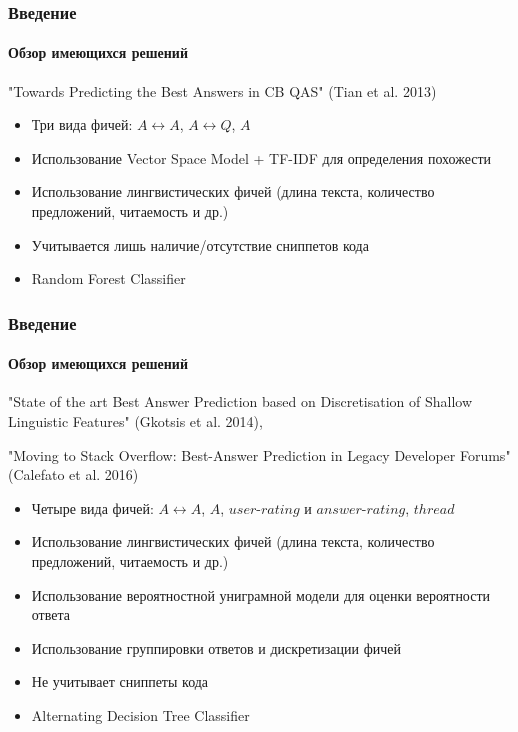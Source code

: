 \documentclass[10pt]{beamer}
\begin{document}

\begin{frame}
\frametitle{Введение}
\framesubtitle{Обзор имеющихся решений}

"Towards Predicting the Best Answers in CB QAS" (Tian et al. 2013)
\begin{itemize}
	\item Три вида фичей: $A \leftrightarrow A$, $A \leftrightarrow Q$, $A$
	\item Использование Vector Space Model + TF-IDF для определения похожести
	\item Использование лингвистических фичей (длина текста, количество предложений, читаемость и др.)
	\item Учитывается лишь наличие/отсутствие сниппетов кода
	\item Random Forest Classifier
\end{itemize}

\end{frame}


\begin{frame}
\frametitle{Введение}
\framesubtitle{Обзор имеющихся решений}

"State of the art Best Answer Prediction based on Discretisation of Shallow Linguistic Features" (Gkotsis et al. 2014), 

"Moving to Stack Overflow: Best-Answer Prediction in Legacy Developer Forums" (Calefato et al. 2016)
\begin{itemize}
	\item Четыре вида фичей: $A \leftrightarrow A$, $A$, $user$-$rating$ и $answer$-$rating$, $thread$
	\item Использование лингвистических фичей (длина текста, количество предложений, читаемость и др.)
	\item Использование вероятностной униграмной модели для оценки вероятности ответа
	\item Использование группировки ответов и дискретизации фичей
	\item Не учитывает сниппеты кода
	\item Alternating Decision Tree Classifier
\end{itemize}

\end{frame}

\end{document}

